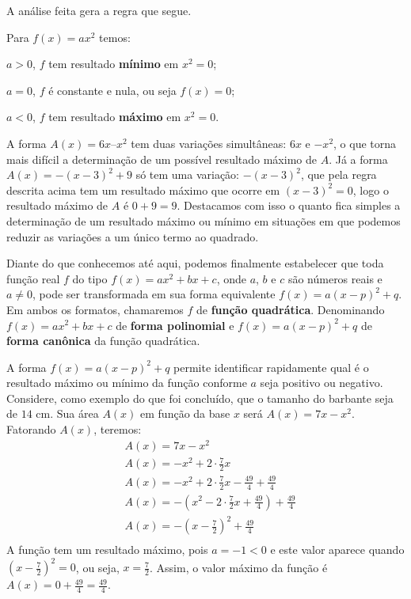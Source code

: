 A análise feita gera a regra que segue.

\begin{observation}{}

Para \(f(x)=ax^2\) temos:

\(a > 0\), \(f\) tem resultado \textbf{mínimo} em \(x^2 = 0\);

\(a = 0\), \(f\) é constante e nula, ou seja \(f(x)=0\);

\(a < 0\), \(f\) tem resultado \textbf{máximo} em \(x^2 = 0\).
\end{observation}

A forma \(A(x) = 6x – x^2\) tem duas variações simultâneas: \(6x\) e \(-x^2\), o que torna mais difícil a determinação de um possível resultado máximo de \(A\). Já a forma \(A(x)=-(x-3)^2 +9\) só tem uma variação: \(-(x-3)^2\), que pela regra descrita acima tem um resultado máximo que ocorre em \((x-3)^2=0\), logo o resultado máximo de \(A\) é \(0+9=9\). Destacamos com isso o quanto fica simples a determinação de um resultado máximo ou mínimo em situações em que podemos reduzir as variações a um único termo ao quadrado.

Diante do que conhecemos até aqui, podemos finalmente estabelecer que toda função real \(f\) do tipo \(f(x)=ax^{2}+bx+c\), onde \(a\), \(b\) e \(c\) são números reais e \(a \neq 0\), pode ser transformada em sua forma equivalente \(f(x)=a(x-p)^{2}+q\). Em ambos os formatos, chamaremos \(f\) de \textbf{função quadrática}. Denominando \(f(x)=ax^{2}+bx+c\) de \textbf{forma polinomial} e \(f(x)=a(x-p)^{2}+q\) de \textbf{forma canônica} da função quadrática.

A forma \(f(x)=a(x-p)^{2}+q\) permite identificar rapidamente  qual é o resultado máximo ou mínimo da função conforme \(a\) seja positivo ou negativo.
Considere, como exemplo do que foi concluído, que o tamanho do barbante seja de \(14\) cm. Sua área \(A(x)\) em função da base \(x\) será \(A(x)=7x-x^{2}\). Fatorando \(A(x)\), teremos:
\begin{equation*}
\begin{split}& A(x)= 7x-x^{2}\\
& A(x)=-x^{2}+2 \cdot \frac{7}{2}x\\
& A(x)=-x^{2}+2 \cdot \frac{7}{2}x - \frac{49}{4} + \frac{49}{4}\\
& A(x)=-\left(x^{2}-2 \cdot \frac{7}{2}x + \frac{49}{4}\right) + \frac{49}{4}\\
& A(x)=- \left(x - \frac{7}{2} \right )^{2}+ \frac{49}{4}\\\end{split}
\end{equation*}
A função tem um resultado máximo, pois \(a=-1<0\) e este valor aparece quando \(\displaystyle\left(x-\frac{7}{2}\right)^{2}=0\), ou seja, \(x=\frac{7}{2}\). Assim, o valor máximo da função é \(\displaystyle A(x)=0+\frac{49}{4}=\frac{49}{4}\).

